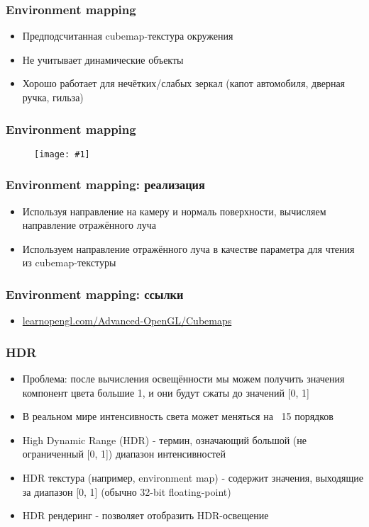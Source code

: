 \documentclass{beamer}
\newcommand{\slideimage}[1]{
  \begin{figure}
    \begin{adjustbox}{width=\textwidth, totalheight=\textheight-2\baselineskip-2\baselineskip,keepaspectratio}
      \texttt{[image: \#1]}
    \end{adjustbox}
  \end{figure}
}
\begin{document}
\begin{frame}[fragile]
\frametitle{Environment mapping}
\begin{itemize}
\item Предподсчитанная cubemap-текстура окружения
\pause
\item Не учитывает динамические объекты
\pause
\item Хорошо работает для нечётких/слабых зеркал (капот автомобиля, дверная ручка, гильза)
\end{itemize}
\end{frame}

\begin{frame}[fragile]
\frametitle{Environment mapping}
\slideimage{env-map.jpg}
\end{frame}

\begin{frame}[fragile]
\frametitle{Environment mapping: реализация}
\begin{itemize}
\item Используя направление на камеру и нормаль поверхности, вычисляем направление отражённого луча
\pause
\item Используем направление отражённого луча в качестве параметра для чтения из cubemap-текстуры
\end{itemize}
\end{frame}

\begin{frame}[fragile]
\frametitle{Environment mapping: ссылки}
\begin{itemize}
\item \href{https://learnopengl.com/Advanced-OpenGL/Cubemaps}{learnopengl.com/Advanced-OpenGL/Cubemaps}
\end{itemize}
\end{frame}

\begin{frame}[fragile]
\frametitle{HDR}
\begin{itemize}
\item Проблема: после вычисления освещённости мы можем получить значения компонент цвета большие 1, и они будут сжаты до значений [0, 1]
\pause
\item В реальном мире интенсивность света может меняться на ~15 порядков
\pause
\item High Dynamic Range (HDR) - термин, означающий большой (не ограниченный [0, 1]) диапазон интенсивностей
\pause
\item HDR текстура (например, environment map) - содержит значения, выходящие за диапазон [0, 1] (обычно 32-bit floating-point)
\pause
\item HDR рендеринг - позволяет отобразить HDR-освещение
\end{itemize}
\end{frame}
\end{document}
